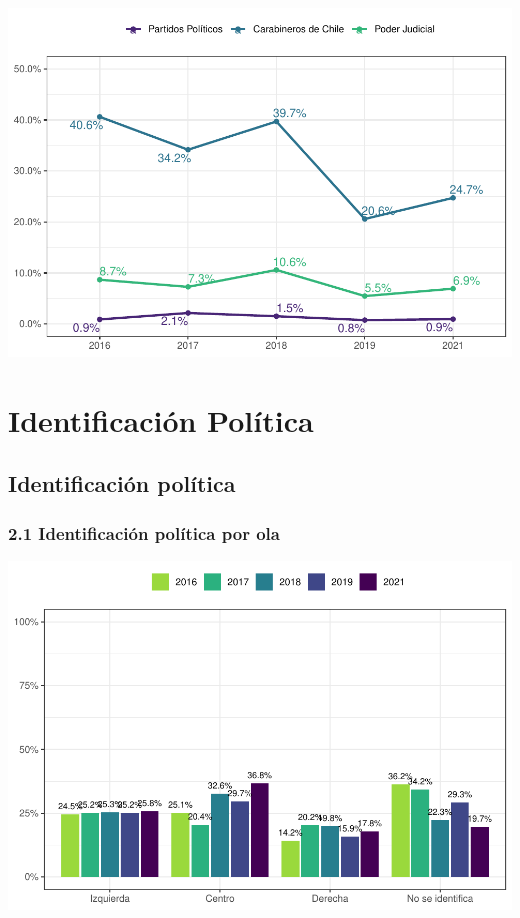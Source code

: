 \documentclass[
  12pt,
  openany]{book}
\begin{document}
\includegraphics{reporte-elsoc_files/figure-latex/unnamed-chunk-15-1.pdf}

\hypertarget{identificaciuxf3n-poluxedtica}{%
\chapter{Identificación Política}\label{identificaciuxf3n-poluxedtica}}

\hypertarget{identificaciuxf3n-poluxedtica-1}{%
\section{Identificación política}\label{identificaciuxf3n-poluxedtica-1}}

\hypertarget{identificaciuxf3n-poluxedtica-por-ola}{%
\subsection{2.1 Identificación política por ola}\label{identificaciuxf3n-poluxedtica-por-ola}}

\includegraphics{reporte-elsoc_files/figure-latex/unnamed-chunk-16-1.pdf}
\end{document}
